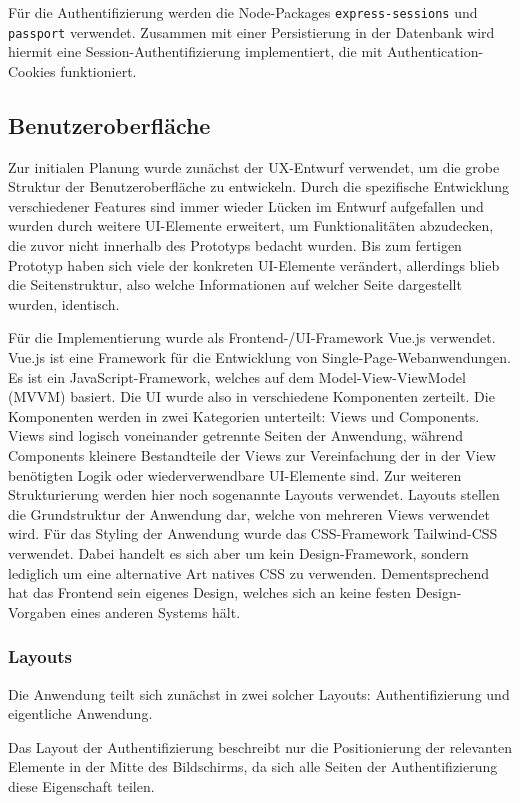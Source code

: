 Für die Authentifizierung werden die Node-Packages \verb|express-sessions| und \verb|passport| verwendet. Zusammen mit einer Persistierung in der Datenbank wird hiermit eine Session-Authentifizierung implementiert, die mit Authentication-Cookies funktioniert.

\subsection{Benutzeroberfläche}
Zur initialen Planung wurde zunächst der UX-Entwurf verwendet, um die grobe Struktur der Benutzeroberfläche zu entwickeln. Durch die spezifische Entwicklung verschiedener Features sind immer wieder Lücken im Entwurf aufgefallen und wurden durch weitere UI-Elemente erweitert, um Funktionalitäten abzudecken, die zuvor nicht innerhalb des Prototyps bedacht wurden. Bis zum fertigen Prototyp haben sich viele der konkreten UI-Elemente verändert, allerdings blieb die Seitenstruktur, also welche Informationen auf welcher Seite dargestellt wurden, identisch.

Für die Implementierung wurde als Frontend-/UI-Framework Vue.js verwendet. Vue.js ist eine Framework für die Entwicklung von Single-Page-Webanwendungen. Es ist ein JavaScript-Framework, welches auf dem Model-View-ViewModel (MVVM) basiert. Die UI wurde also in verschiedene Komponenten zerteilt. Die Komponenten werden in zwei Kategorien unterteilt: Views und Components. Views sind logisch voneinander getrennte Seiten der Anwendung, während Components kleinere Bestandteile der Views zur Vereinfachung der in der View benötigten Logik oder wiederverwendbare UI-Elemente sind. Zur weiteren Strukturierung werden hier noch sogenannte Layouts verwendet. Layouts stellen die Grundstruktur der Anwendung dar, welche von mehreren Views verwendet wird. Für das Styling der Anwendung wurde das CSS-Framework Tailwind-CSS verwendet. Dabei handelt es sich aber um kein Design-Framework, sondern lediglich um eine alternative Art natives CSS zu verwenden. Dementsprechend hat das Frontend sein eigenes Design, welches sich an keine festen Design-Vorgaben eines anderen Systems hält.

\subsubsection{Layouts}
Die Anwendung teilt sich zunächst in zwei solcher Layouts: Authentifizierung und eigentliche Anwendung.

Das Layout der Authentifizierung beschreibt nur die Positionierung der relevanten Elemente in der Mitte des Bildschirms, da sich alle Seiten der Authentifizierung diese Eigenschaft teilen.

